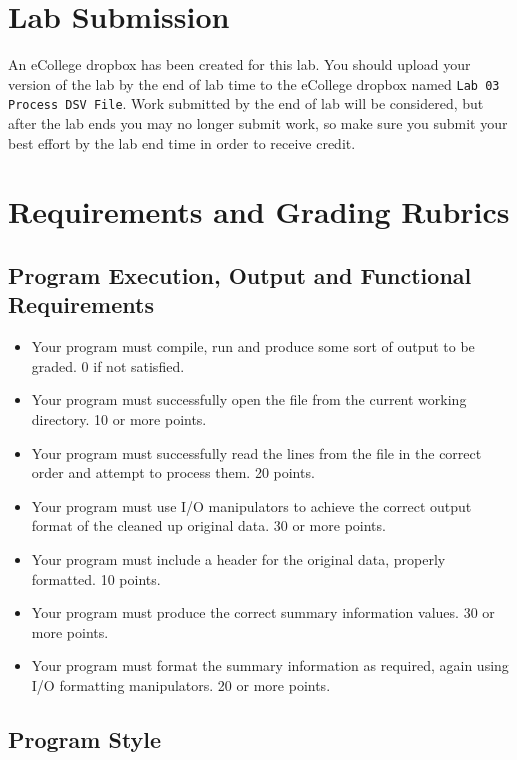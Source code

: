 \documentclass[11pt]{article}
\begin{document}
\section*{Lab Submission}
\label{sec-4}

An eCollege dropbox has been created for this lab.  You should
upload your version of the lab by the end of lab time to the eCollege
dropbox named \verb~Lab 03 Process DSV File~.  Work submitted by the end
of lab will be considered, but after the lab ends you may no longer
submit work, so make sure you submit your best effort by the lab end
time in order to receive credit.
\section*{Requirements and Grading Rubrics}
\label{sec-5}

\subsection*{Program Execution, Output and Functional Requirements}
\label{sec-5-1}

\begin{itemize}
\item Your program must compile, run and produce some sort of output to be
graded. 0 if not satisfied.
\item Your program must successfully open the file from the current
working directory. 10 or more points.
\item Your program must successfully read the lines from the file in the
correct order and attempt to process them. 20 points.
\item Your program must use I/O manipulators to achieve the correct output
format of the cleaned up original data.  30 or more points.
\item Your program must include a header for the original data, properly
formatted. 10 points.
\item Your program must produce the correct summary information values. 30
or more points.
\item Your program must format the summary information as required, again
using I/O formatting manipulators.  20 or more points.
\end{itemize}

\subsection*{Program Style}
\label{sec-5-2}
\end{document}
